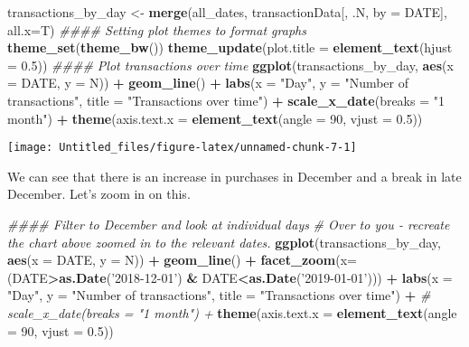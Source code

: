 \documentclass[]{article}
\newenvironment{Shaded}{\begin{snugshade}}{\end{snugshade}}
\newcommand{\CommentTok}[1]{\textcolor[rgb]{0.56,0.35,0.01}{\textit{#1}}}
\newcommand{\DataTypeTok}[1]{\textcolor[rgb]{0.13,0.29,0.53}{#1}}
\newcommand{\DecValTok}[1]{\textcolor[rgb]{0.00,0.00,0.81}{#1}}
\newcommand{\FloatTok}[1]{\textcolor[rgb]{0.00,0.00,0.81}{#1}}
\newcommand{\KeywordTok}[1]{\textcolor[rgb]{0.13,0.29,0.53}{\textbf{#1}}}
\newcommand{\NormalTok}[1]{#1}
\newcommand{\OperatorTok}[1]{\textcolor[rgb]{0.81,0.36,0.00}{\textbf{#1}}}
\newcommand{\StringTok}[1]{\textcolor[rgb]{0.31,0.60,0.02}{#1}}
\begin{document}
\begin{Shaded}
\begin{Highlighting}[]
\NormalTok{transactions_by_day <-}\StringTok{ }\KeywordTok{merge}\NormalTok{(all_dates, transactionData[, .N, }\DataTypeTok{by =}\NormalTok{ DATE], }\DataTypeTok{all.x=}\NormalTok{T) }
\CommentTok{#### Setting plot themes to format graphs}
\KeywordTok{theme_set}\NormalTok{(}\KeywordTok{theme_bw}\NormalTok{())}
\KeywordTok{theme_update}\NormalTok{(}\DataTypeTok{plot.title =} \KeywordTok{element_text}\NormalTok{(}\DataTypeTok{hjust =} \FloatTok{0.5}\NormalTok{))}
\CommentTok{#### Plot transactions over time}
\KeywordTok{ggplot}\NormalTok{(transactions_by_day, }\KeywordTok{aes}\NormalTok{(}\DataTypeTok{x =}\NormalTok{ DATE, }\DataTypeTok{y =}\NormalTok{ N)) }\OperatorTok{+}
\KeywordTok{geom_line}\NormalTok{() }\OperatorTok{+}
\KeywordTok{labs}\NormalTok{(}\DataTypeTok{x =} \StringTok{"Day"}\NormalTok{, }\DataTypeTok{y =} \StringTok{"Number of transactions"}\NormalTok{, }\DataTypeTok{title =} \StringTok{"Transactions over time"}\NormalTok{) }\OperatorTok{+}
\KeywordTok{scale_x_date}\NormalTok{(}\DataTypeTok{breaks =} \StringTok{"1 month"}\NormalTok{) }\OperatorTok{+}
\KeywordTok{theme}\NormalTok{(}\DataTypeTok{axis.text.x =} \KeywordTok{element_text}\NormalTok{(}\DataTypeTok{angle =} \DecValTok{90}\NormalTok{, }\DataTypeTok{vjust =} \FloatTok{0.5}\NormalTok{))}
\end{Highlighting}
\end{Shaded}

\begin{center}\texttt{[image: Untitled\_files/figure-latex/unnamed-chunk-7-1]} \end{center}

We can see that there is an increase in purchases in December and a
break in late December. Let's zoom in on this.

\begin{Shaded}
\begin{Highlighting}[]
\CommentTok{#### Filter to December and look at individual days}
\CommentTok{# Over to you - recreate the chart above zoomed in to the relevant dates.}
\KeywordTok{ggplot}\NormalTok{(transactions_by_day, }\KeywordTok{aes}\NormalTok{(}\DataTypeTok{x =}\NormalTok{ DATE, }\DataTypeTok{y =}\NormalTok{ N)) }\OperatorTok{+}
\KeywordTok{geom_line}\NormalTok{() }\OperatorTok{+}
\KeywordTok{facet_zoom}\NormalTok{(}\DataTypeTok{x=}\NormalTok{ (DATE}\OperatorTok{>}\KeywordTok{as.Date}\NormalTok{(}\StringTok{'2018-12-01'}\NormalTok{) }\OperatorTok{&}\StringTok{ }\NormalTok{DATE}\OperatorTok{<}\KeywordTok{as.Date}\NormalTok{(}\StringTok{'2019-01-01'}\NormalTok{))) }\OperatorTok{+}
\KeywordTok{labs}\NormalTok{(}\DataTypeTok{x =} \StringTok{"Day"}\NormalTok{, }\DataTypeTok{y =} \StringTok{"Number of transactions"}\NormalTok{, }\DataTypeTok{title =} \StringTok{"Transactions over time"}\NormalTok{) }\OperatorTok{+}
\CommentTok{# scale_x_date(breaks = "1 month") +}
\KeywordTok{theme}\NormalTok{(}\DataTypeTok{axis.text.x =} \KeywordTok{element_text}\NormalTok{(}\DataTypeTok{angle =} \DecValTok{90}\NormalTok{, }\DataTypeTok{vjust =} \FloatTok{0.5}\NormalTok{))}
\end{Highlighting}
\end{Shaded}
\end{document}
